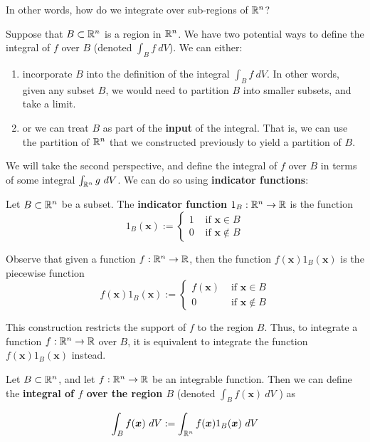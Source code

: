     In other words, how do we integrate over sub-regions of $\mathbb{R}^n$?

    Suppose that $B \subset \mathbb{R}^n$ is a region in $\mathbb{R}^n$.  We have two potential ways to define the integral of $f$ over $B$ (denoted $\int_B f \ dV$).  We can either:

    \begin{enumerate}
        \item incorporate $B$ into the definition of the integral $\int_B f \ dV$.        
    In other words, given any subset $B$, we would need to partition $B$ into smaller subsets, and take a limit.
        \item or we can treat $B$ as part of the \textbf{input} of the integral.
        That is, we can use the partition of $\mathbb{R}^n$ that we constructed previously to yield a partition of $B$.
        
    \end{enumerate}

    We will take the second perspective, and define the integral of $f$ over $B$ in terms of some integral $\int_{\R^n} g \ dV$.  We can do so using \textbf{indicator functions}:

    \begin{definition}
    Let $B \subset \mathbb{R}^n$ be a subset.  The \textbf{indicator function} $1_B  :\mathbb{R}^n \to \mathbb{R}$ is the function 
    $$1_B(\bm{x}) := \left\{
		\begin{array}{ll}
			1 & \text{ if } \bm{x} \in B \\
			0 & \text{ if } \bm{x} \notin B
		\end{array}
		\right.$$
    
    \end{definition}

    Observe that given a function $f: \mathbb{R}^n \to \mathbb{R}$, then the function $f(\bm{x})1_B(\bm{x})$ is the piecewise function
    $$f(\bm{x})1_B(\bm{x}) := \left\{
		\begin{array}{ll}
			f(\bm{x}) & \text{ if } \bm{x} \in B \\
			0 & \text{ if } \bm{x} \notin B
		\end{array}
		\right.$$

    This construction restricts the support of $f$ to the region $B$.  Thus, to integrate a function $f: \mathbb{R}^n \to \mathbb{R}$ over $B$, it is equivalent to integrate the function $f(\bm{x})1_B(\bm{x})$ instead.

    \begin{definition}
     Let $B \subset \mathbb{R}^n$, and let $f : \mathbb{R}^n \to \mathbb{R}$ be an integrable function.  Then we can define the \textbf{integral of $f$ over the region $B$} (denoted $\int_B f(\bm{x}) \ dV$ )   as

    $$\int_B f(\bm{x}) \ dV := \int_{\mathbb{R}^n} f(\bm{x})1_B(\bm{x}) \ dV$$
     
    \end{definition}
    
